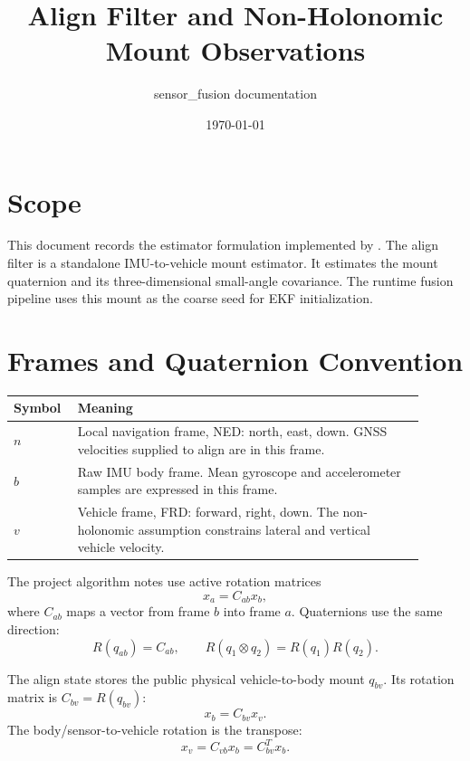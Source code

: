 \documentclass[11pt]{article}
\title{Align Filter and Non-Holonomic Mount Observations}
\author{sensor\_fusion documentation}
\date{\today}
\newcommand{\T}{^{T}}
\begin{document}
\maketitle
\tableofcontents
\newpage

\section{Scope}

This document records the estimator formulation implemented by
. The align filter is a standalone IMU-to-vehicle
mount estimator. It estimates the mount quaternion and its three-dimensional
small-angle covariance. The runtime fusion pipeline uses this mount as the
coarse seed for EKF initialization.

\section{Frames and Quaternion Convention}

\begin{longtable}{>{\raggedright\arraybackslash}p{0.12\linewidth} >{\raggedright\arraybackslash}p{0.78\linewidth}}
\toprule
\textbf{Symbol} & \textbf{Meaning} \\
\midrule
\(n\) & Local navigation frame, NED: north, east, down. GNSS velocities supplied to align are in this frame. \\
\(b\) & Raw IMU body frame. Mean gyroscope and accelerometer samples are expressed in this frame. \\
\(v\) & Vehicle frame, FRD: forward, right, down. The non-holonomic assumption constrains lateral and vertical vehicle velocity. \\
\bottomrule
\end{longtable}

The project algorithm notes use active rotation matrices
\begin{equation}
  x_a = C_{ab} x_b ,
\end{equation}
where \(C_{ab}\) maps a vector from frame \(b\) into frame \(a\). Quaternions
use the same direction:
\begin{equation}
  R(q_{ab})=C_{ab},\qquad
  R(q_1 \otimes q_2)=R(q_1)R(q_2).
\end{equation}

The align state stores the public physical vehicle-to-body mount \(q_{bv}\).
Its rotation matrix is \(C_{bv}=R(q_{bv})\):
\begin{equation}
  x_b = C_{bv} x_v .
\end{equation}
The body/sensor-to-vehicle rotation is the transpose:
\begin{equation}
  x_v = C_{vb} x_b = C_{bv}\T x_b .
\end{equation}
\end{document}
